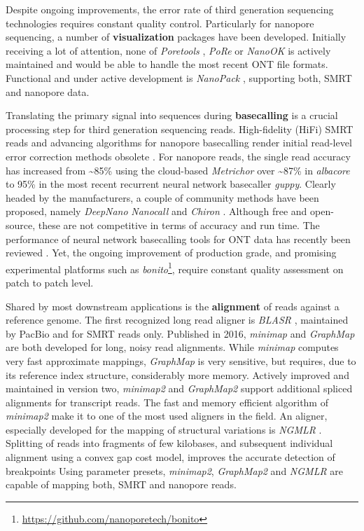 Despite ongoing improvements, the error rate of third generation sequencing technologies requires constant quality control. Particularly for nanopore sequencing, a number of \textbf{visualization} packages have been developed.
Initially receiving a lot of attention, none of \textit{Poretools} \cite{Loman2014},
\textit{PoRe} \cite{Watson2014} or \textit{NanoOK} \cite{Leggett2016} is actively maintained and would be able to handle the most recent ONT file formats.
Functional and under active development is \textit{NanoPack} \cite{DeCoster2018}, supporting both, SMRT and nanopore data.

Translating the primary signal into sequences during \textbf{basecalling} is a crucial processing step for third generation sequencing reads.
High-fidelity (HiFi) SMRT reads and advancing algorithms for nanopore basecalling render initial read-level error correction methods obsolete \cite{Koren2012, Hackl2014, Goodwin2015}.
For nanopore reads, the single read accuracy has increased from \textasciitilde85\% using the cloud-based \textit{Metrichor} over \textasciitilde87\% in \textit{albacore} to 95\% in the most recent recurrent neural network basecaller \textit{guppy}.
Clearly headed by the manufacturers, a couple of community methods have been proposed, namely 
\textit{DeepNano} \cite{Boza2017} \textit{Nanocall} \cite{David2017} and \textit{Chiron} \cite{Teng2018}.
Although free and open-source, these are not competitive in terms of accuracy and run time.
The performance of neural network basecalling tools for ONT data has recently been reviewed \cite{Wick2019}.
Yet, the ongoing improvement of production grade, and promising experimental platforms such as \textit{bonito}\footnote{\url{https://github.com/nanoporetech/bonito}}, require constant quality assessment on patch to patch level.

Shared by most downstream applications is the \textbf{alignment} of reads against a reference genome.
The first recognized long read aligner is \textit{BLASR} \cite{Chaisson2012}, maintained by PacBio and for SMRT reads only.
Published in 2016, \textit{minimap} \cite{Li2016} and \textit{GraphMap} \cite{Sovic2016} are both developed for long, noisy read alignments.
While \textit{minimap} computes very fast approximate mappings, \textit{GraphMap} is very sensitive, but requires, due to its reference index structure, considerably more memory.
Actively improved and maintained in version two, \textit{minimap2} \cite{Li2018} and \textit{GraphMap2} \cite{Maric2019} support additional spliced alignments for transcript reads.
The fast and memory efficient algorithm of \textit{minimap2} make it to one of the most used aligners in the field.
An aligner, especially developed for the mapping of structural variations is \textit{NGMLR} \cite{Sedlazeck2018}.
Splitting of reads into fragments of few kilobases, and subsequent individual alignment using a convex gap cost model, improves the accurate detection of breakpoints
Using parameter presets, \textit{minimap2}, \textit{GraphMap2} and \textit{NGMLR} are capable of mapping both, SMRT and nanopore reads.




